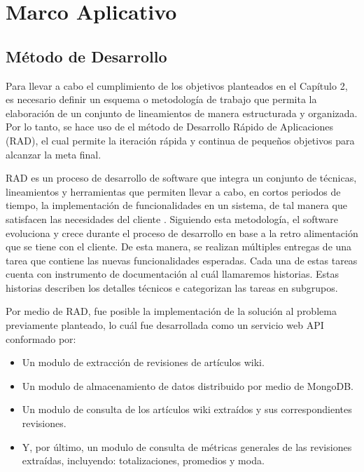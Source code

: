 \section{Marco Aplicativo}

\subsection{Método de Desarrollo}

Para llevar a cabo el cumplimiento de los objetivos planteados en el Capítulo 2, es necesario definir un
esquema o metodología de trabajo que permita la elaboración de un conjunto de
lineamientos de manera estructurada y organizada. Por lo tanto, se hace uso de el método de
Desarrollo Rápido de Aplicaciones (RAD), el cual permite la iteración rápida y continua
de pequeños objetivos para alcanzar la meta final.

RAD es un proceso de desarrollo de software que
integra un conjunto de técnicas, lineamientos y herramientas que permiten llevar a cabo, en
cortos periodos de tiempo, la implementación de funcionalidades en un sistema, de tal manera que
satisfacen las necesidades del cliente \cite{23}.
Siguiendo esta metodología, el software evoluciona y crece durante el proceso de desarrollo en base a la retro alimentación que se tiene con el cliente.
De esta manera, se realizan múltiples entregas de una tarea que
contiene las nuevas funcionalidades esperadas.
Cada una de estas tareas cuenta con instrumento de documentación al cuál llamaremos historias.
Estas historias describen los detalles técnicos e categorizan las tareas en subgrupos.

Por medio de RAD, fue posible la implementación de la solución al problema previamente planteado, lo cuál fue desarrollada como un servicio web API conformado por:

\begin{itemize}

\item Un modulo de extracción de revisiones de artículos wiki.

\item Un modulo de almacenamiento de datos distribuido por medio de MongoDB.

\item Un modulo de consulta de los artículos wiki extraídos y sus correspondientes revisiones.

\item Y, por último, un modulo de consulta de métricas generales de las revisiones extraídas, incluyendo: totalizaciones, promedios y moda.

\end{itemize}

